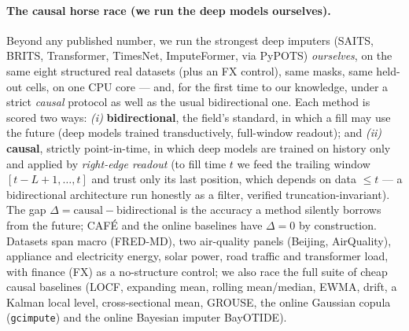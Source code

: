 \documentclass[10pt,twocolumn]{article}
\newcommand{\cafe}{CAF\'E}
\begin{document}
\paragraph{The causal horse race (we run the deep models ourselves).}
Beyond any published number, we run the strongest deep imputers
(SAITS, BRITS, Transformer, TimesNet, ImputeFormer, via PyPOTS) \emph{ourselves},
on the same eight structured real datasets (plus an FX control), same masks, same
held-out cells, on one CPU core
--- and, for the first time to our knowledge, under a strict \emph{causal}
protocol as well as the usual bidirectional one. Each method is scored two ways:
\emph{(i)} \textbf{bidirectional}, the field's standard, in which a fill may use
the future (deep models trained transductively, full-window readout); and
\emph{(ii)} \textbf{causal}, strictly point-in-time, in which deep models are
trained on history only and applied by \emph{right-edge readout} (to fill time
$t$ we feed the trailing window $[t{-}L{+}1,\dots,t]$ and trust only its last
position, which depends on data $\le t$ --- a bidirectional architecture run
honestly as a filter, verified truncation-invariant). The gap
$\Delta=\text{causal}-\text{bidirectional}$ is the accuracy a method silently
borrows from the future; \cafe{} and the online baselines have $\Delta=0$ by
construction. Datasets span macro (FRED-MD), two air-quality panels (Beijing,
AirQuality), appliance and electricity energy, solar power, road traffic and
transformer load, with finance (FX) as a no-structure control; we also race the
full suite of cheap causal baselines (LOCF,
expanding mean, rolling mean/median, EWMA, drift, a Kalman local level,
cross-sectional mean, GROUSE, the online Gaussian copula (\texttt{gcimpute}) and
the online Bayesian
imputer BayOTIDE).
\end{document}
